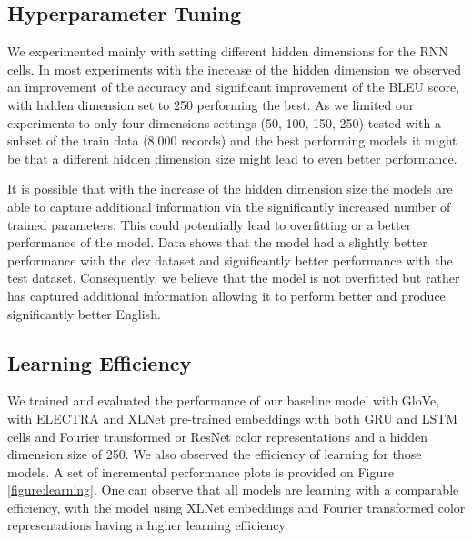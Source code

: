 \subsection{Hyperparameter Tuning}
We experimented mainly with setting different hidden dimensions for the RNN cells. In most experiments with the increase of the hidden dimension we observed an improvement of the accuracy and significant improvement of the BLEU score, with hidden dimension set to 250 performing the best. As we limited our experiments to only four dimensions settings (50, 100, 150, 250) tested with a subset of the train data (8,000 records) and the best performing models it might be that a different hidden dimension size might lead to even better performance.

\par
It is possible that with the increase of the hidden dimension size the models are able to capture additional information via the significantly increased number of trained parameters. This could potentially lead to overfitting or a better performance of the model. Data shows that the model had a slightly better performance with the dev dataset and significantly better performance with the test dataset. Consequently, we believe that the model is not overfitted but rather has captured additional information allowing it to perform better and produce significantly better English.

\subsection{Learning Efficiency}
We trained and evaluated the performance of our baseline model with GloVe, with ELECTRA and XLNet pre-trained embeddings with both GRU and LSTM cells and Fourier transformed or ResNet color representations and a hidden dimension size of 250. We also observed the efficiency of learning for those models. A set of incremental performance plots is provided on Figure \ref{figure:learning}. One can observe that all models are learning with a comparable efficiency, with the model using XLNet embeddings and Fourier transformed color representations having a higher learning efficiency.

